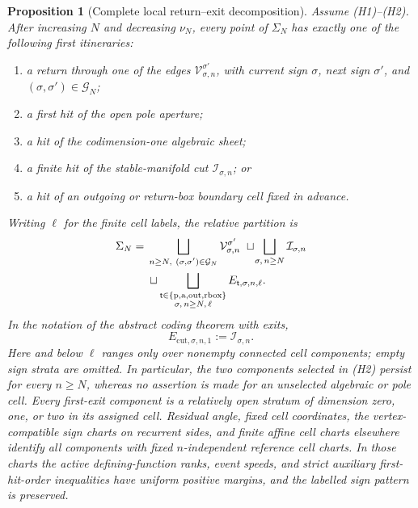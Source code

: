 \documentclass[11pt]{amsart}
\numberwithin{equation}{section}
\newtheorem{proposition}[theorem]{Proposition}
\theoremstyle{definition}
\theoremstyle{remark}
\newcommand{\rbox}{\mathrm{rbox}}
\begin{document}
\begin{proposition}[Complete local return--exit decomposition]
\label{prop:first-exit-family}
Assume \textup{(H1)}--\textup{(H2)}.  After increasing $N$ and decreasing
$\nu_N$, every point of $\Sigma_N$ has
exactly one of the following first itineraries:
\begin{enumerate}
\renewcommand{\labelenumi}{\textup{(\alph{enumi})}}
\item a return through one of the edges
$\mathcal V_{\sigma,n}^{\sigma'}$, with current sign $\sigma$, next sign
$\sigma'$, and $(\sigma,\sigma')\in\mathcal G_N$;
\item a first hit of the open pole aperture;
\item a hit of the codimension-one algebraic sheet;
\item a finite hit of the stable-manifold cut
$\mathcal I_{\sigma,n}$; or
\item a hit of an outgoing or return-box boundary cell fixed in advance.
\end{enumerate}
Writing $\ell$ for the finite cell labels, the relative partition is
\begin{align}
 \Sigma_N={}&
 \bigsqcup_{\substack{n\ge N,\ (\sigma,\sigma')\in\mathcal G_N}}
     \mathcal V_{\sigma,n}^{\sigma'}
 \ \sqcup\!
 \bigsqcup_{\sigma,\,n\ge N}\mathcal I_{\sigma,n}
 \notag\\
 &\sqcup
 \bigsqcup_{\substack{\mathsf t\in\{\mathrm p,\mathrm a,
       \mathrm{out},\rbox\}\\
       \sigma,\,n\ge N,\,\ell}}
     E_{\mathsf t,\sigma,n,\ell}.
 \label{eq:local-relative-partition}
\end{align}
In the notation of the abstract coding theorem with exits,
\begin{equation}\label{eq:ideal-seam-terminal}
 E_{\mathrm{cut},\sigma,n,1}:=\mathcal I_{\sigma,n}.
\end{equation}
Here and below $\ell$ ranges only over nonempty connected cell
components; empty sign strata are omitted.  In particular, the two
components selected in \textup{(H2)} persist for every $n\ge N$, whereas
no assertion is made for an unselected algebraic or pole cell.
Every first-exit component is a relatively open stratum of dimension zero,
one, or two in its assigned cell.  Residual angle, fixed cell coordinates,
the vertex-compatible sign charts on recurrent sides, and finite affine
cell charts elsewhere identify all components with fixed
$n$-independent reference cell charts.  In those charts the active
defining-function ranks, event speeds, and strict auxiliary first-hit-order
inequalities have uniform positive margins, and the labelled sign pattern
is preserved.
\end{proposition}
\end{document}
